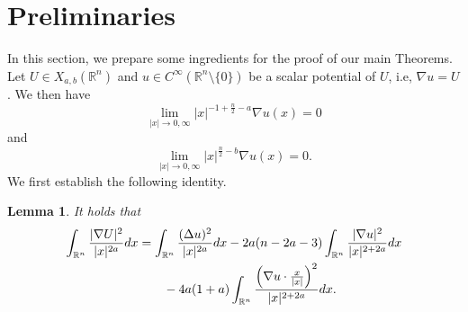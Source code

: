 \documentclass[a4paper,12pt]{article}
\theoremstyle{plain}
\newtheorem{lemma}[theorem]{Lemma}
\theoremstyle{definition}
\theoremstyle{remark}
\def\R{\mathbb R}%
\def\irn{\int_{\R^n}}
\numberwithin{equation}{section}
\begin{document}
\section{Preliminaries}\label{s2}
In this section, we prepare some ingredients for  the proof of our main Theorems. Let $U\in X_{a,b}(\R^n)$ and $u\in C^\infty(\R^n\setminus\{0\})$ be a scalar potential of $U$, i.e, $\nabla u = U$. We then have
\begin{equation}\label{eq:condu1}
\lim_{|x|\to 0,\infty} |x|^{-1 + \frac n2 - a}\nabla u(x) = 0
\end{equation}
and
\begin{equation*}%
\lim_{|x|\to 0,\infty} |x|^{\frac n2 - b} \nabla u(x) = 0.
\end{equation*}
We first establish  the following identity.
\begin{lemma}\label{D2toDelta}
It holds that
\begin{align}\label{eq:D2toDelta}
\int_{\R^n} \frac{|\nabla U|^2}{|x|^{2a}} dx &=\irn \frac{(\Delta u)^2}{ |x|^{2a}} dx -2a(n -2a -3)\irn \frac{|\nabla u|^2}{|x|^{2 + 2a}} dx\notag\\
&\qquad -4a(1+a) \irn \frac{\Big(\nabla u \cdot \frac x{|x|}\Big)^2 }{|x|^{2 + 2a}} dx.
\end{align}
\end{lemma} 
\end{document}

